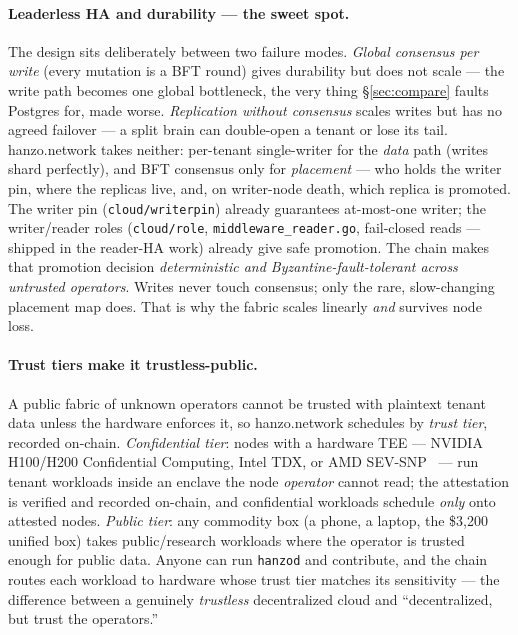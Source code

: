 \documentclass[11pt]{article}
\begin{document}
\paragraph{Leaderless HA and durability --- the sweet spot.} The design sits deliberately between
two failure modes. \emph{Global consensus per write} (every mutation is a BFT round) gives
durability but does not scale --- the write path becomes one global bottleneck, the very thing
\S\ref{sec:compare} faults Postgres for, made worse. \emph{Replication without consensus} scales
writes but has no agreed failover --- a split brain can double-open a tenant or lose its tail.
hanzo.network takes neither: per-tenant single-writer for the \emph{data} path (writes shard
perfectly), and BFT consensus only for \emph{placement} --- who holds the writer pin, where the
replicas live, and, on writer-node death, which replica is promoted. The writer pin
(\texttt{cloud/writerpin}) already guarantees at-most-one writer; the writer/reader roles
(\texttt{cloud/role}, \texttt{middleware\_reader.go}, fail-closed reads --- shipped in the
reader-HA work) already give safe promotion. The chain makes that promotion decision
\emph{deterministic and Byzantine-fault-tolerant across untrusted operators}. Writes never touch
consensus; only the rare, slow-changing placement map does. That is why the fabric scales linearly
\emph{and} survives node loss.

\paragraph{Trust tiers make it trustless-public.} A public fabric of unknown operators cannot be
trusted with plaintext tenant data unless the hardware enforces it, so hanzo.network schedules by
\emph{trust tier}, recorded on-chain. \emph{Confidential tier}: nodes with a hardware TEE ---
NVIDIA H100/H200 Confidential Computing, Intel TDX, or AMD SEV-SNP~\cite{tee} --- run tenant
workloads inside an enclave the node \emph{operator} cannot read; the attestation is verified and
recorded on-chain, and confidential workloads schedule \emph{only} onto attested nodes.
\emph{Public tier}: any commodity box (a phone, a laptop, the \$3{,}200 unified box) takes
public/research workloads where the operator is trusted enough for public data. Anyone can run
\texttt{hanzod} and contribute, and the chain routes each workload to hardware whose trust tier
matches its sensitivity --- the difference between a genuinely \emph{trustless} decentralized cloud
and ``decentralized, but trust the operators.''
\end{document}
